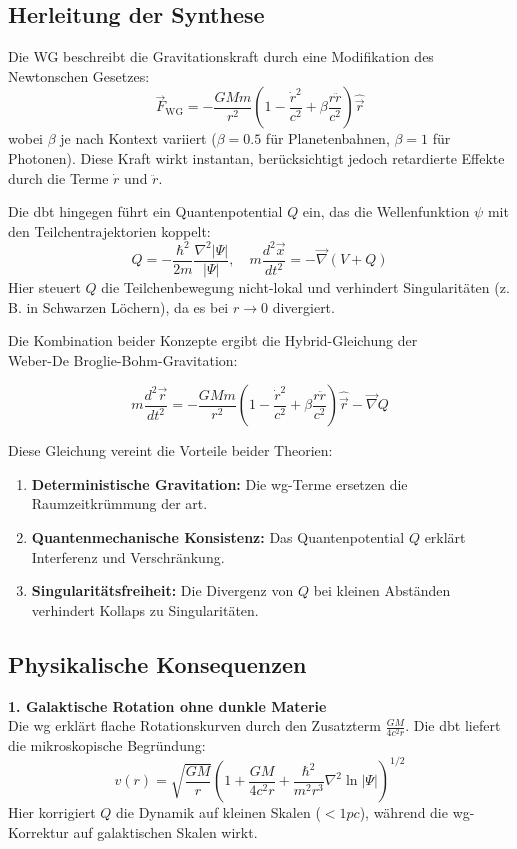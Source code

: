 \subsection{Herleitung der Synthese}
Die WG beschreibt die Gravitationskraft durch eine Modifikation des Newtonschen Gesetzes:
\[
    \vec{F}_{\text{WG}} = -\frac{GMm}{r^2}\left(1 - \frac{\dot{r}^2}{c^2} + \beta \frac{r\ddot{r}}{c^2}\right)\hat{\vec{r}}
\]
wobei $\beta$ je nach Kontext variiert ($\beta=0.5$ für Planetenbahnen, $\beta=1$ für Photonen). Diese Kraft wirkt instantan, berücksichtigt jedoch retardierte Effekte durch die
Terme $\dot{r}$ und $\ddot{r}$.

Die \gls{dbt} hingegen führt ein Quantenpotential $Q$ ein, das die Wellenfunktion $\psi$ mit den Teilchentrajektorien koppelt:
\begin{equation}
    Q = -\frac{\hbar^2}{2m}\frac{\nabla^2 |\Psi|}{|\Psi|}, \quad m\frac{d^2\vec{x}}{dt^2} = -\vec{\nabla}(V + Q)
\end{equation}
Hier steuert $Q$ die Teilchenbewegung nicht-lokal und verhindert Singularitäten (z. B. in Schwarzen Löchern), da es bei $r \to 0$ divergiert.

Die Kombination beider Konzepte ergibt die Hybrid-Gleichung der\\Weber-De Broglie-Bohm-Gravitation:

\begin{equation}
    m\frac{d^2\vec{r}}{dt^2} = -\frac{GMm}{r^2}\left(1 - \frac{\dot{r}^2}{c^2} + \beta \frac{r\ddot{r}}{c^2}\right)\hat{{\vec{r}}} - \vec{\nabla} Q
\end{equation}

Diese Gleichung vereint die Vorteile beider Theorien:
\begin{enumerate}
    \item \textbf{Deterministische Gravitation:} Die \gls{wg}-Terme ersetzen die Raumzeitkrümmung der \gls{art}.
    \item \textbf{Quantenmechanische Konsistenz:} Das Quantenpotential $Q$ erklärt Interferenz und Verschränkung.
    \item \textbf{Singularitätsfreiheit:} Die Divergenz von $Q$ bei kleinen Abständen verhindert Kollaps zu Singularitäten.
\end{enumerate}

\subsection{Physikalische Konsequenzen}
\textbf{1. Galaktische Rotation ohne dunkle Materie}\\
Die \gls{wg} erklärt flache Rotationskurven durch den Zusatzterm $\frac{GM}{4c^2r}$. Die \gls{dbt} liefert die mikroskopische Begründung:
\begin{equation}
    v(r) = \sqrt{\frac{GM}{r}} \left(1 + \frac{GM}{4c^2 r} + \frac{\hbar^2}{m^2 r^3} \nabla^2 \ln|\Psi|\right)^{1/2}
\end{equation}
Hier korrigiert $Q$ die Dynamik auf kleinen Skalen ($<1 pc$), während die \gls{wg}-Korrektur auf galaktischen Skalen wirkt.

